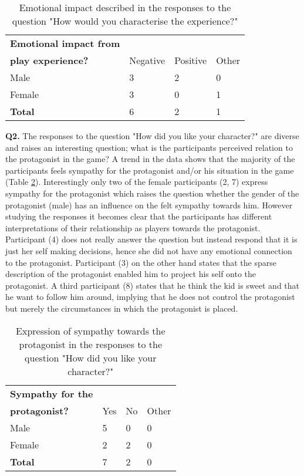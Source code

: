 \begin{table}[h]
\centering
\begin{tabular}{l l l l}
\hline
\textbf{Emotional impact from}\\
\textbf{play experience?} & Negative & Positive & Other \\
\hline
Male & 3 & 2 & 0 \\
Female & 3 & 0 & 1 \\
\textbf{Total} & 6 & 2 & 1 \\
\hline
\end{tabular}
\caption{\label{tab:emo}Emotional impact described in the responses to the question "How would you characterise the experience?"}
\end{table}

\textbf{Q2.} The responses to the question "How did you like your character?" are diverse and raises an interesting question; what is the participants perceived relation to the protagonist in the game? A trend in the data shows that the majority of the participants feels sympathy for the protagonist and/or his situation in the game (Table \ref{tab:symp}). Interestingly only two of the female participants (2, 7) express sympathy for the protagonist which raises the question whether the gender of the protagonist (male) has an influence on the felt sympathy towards him. However studying the responses it becomes clear that the participants has different interpretations of their relationship as players towards the protagonist. Participant (4) does not really answer the question but instead respond that it is just her self making decisions, hence she did not have any emotional connection to the protagonist. Participant (3) on the other hand states that the sparse description of the protagonist enabled him to project his self onto the protagonist. A third participant (8) states that he think the kid is sweet and that he want to follow him around, implying that he does not control the protagonist but merely the circumstances in which the protagonist is placed.

\begin{table}[h]
\centering
\begin{tabular}{l l l l}
\hline
\textbf{Sympathy for the}\\
\textbf{protagonist?} & Yes & No & Other \\
\hline
Male & 5 & 0 & 0 \\
Female & 2 & 2 & 0 \\
\textbf{Total} & 7 & 2 & 0 \\
\hline
\end{tabular}
\caption{\label{tab:symp}Expression of sympathy towards the protagonist in the responses to the question "How did you like your character?"}
\end{table}


